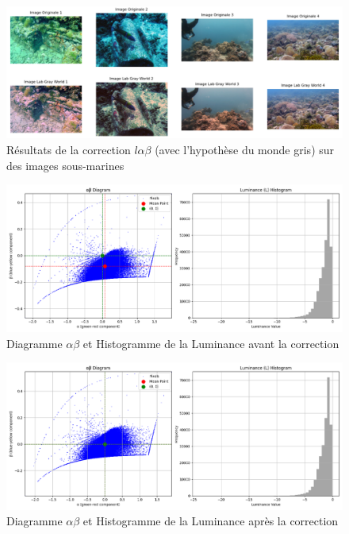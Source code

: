 \documentclass[10pt, a4paper]{extarticle}
\numberwithin{equation}{section}
\numberwithin{figure}{section}
\begin{document}
\begin{figure}[h!]
\begin{center}
\includegraphics[width=18cm]{image006.png}
\end{center}
\label{figure3.1}
\caption{Résultats de la correction $l\alpha\beta$ (avec l'hypothèse du monde gris) sur des images sous-marines}
\end{figure}  

\begin{figure}[h!]
\begin{center}
\includegraphics[width=15cm]{image007.png}
\end{center}
\label{figure3.2}
\caption{Diagramme $\alpha\beta$ et Histogramme de la Luminance avant la correction}
\end{figure} 

\begin{figure}[h!]
\begin{center}
\includegraphics[width=15cm]{image008.png}
\end{center}
\label{figure3.3}
\caption{Diagramme $\alpha\beta$ et Histogramme de la Luminance après la correction}
\end{figure} 
\end{document}
